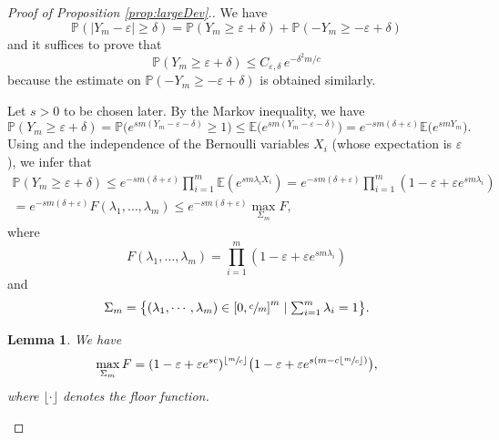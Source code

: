 \documentclass[10pt]{amsart}
\newtheorem{lemma}{Lemma}
\theoremstyle{definition}
\begin{document}
\begin{proof}[Proof of Proposition \ref{prop:largeDev}.]
We have
\[
\mathbb{P}( |Y_m - \varepsilon| \geq \delta) =\mathbb{P}\left(Y_m \geq \varepsilon + \delta\right)+\mathbb{P} \left( -Y_m \geq -\varepsilon + \delta\right)
\]
and it suffices to prove that
\[
\mathbb{P}( Y_m \geq \varepsilon + \delta) \leq C_{\varepsilon,\delta}\, e^{-\delta^2 m/c}
\]
because the estimate on $\mathbb{P} \left( -Y_m \geq -\varepsilon + \delta\right)$ is obtained similarly.

Let $s>0$ to be chosen later. By the Markov inequality, we have
\[
\mathbb{P}( Y_m \geq \varepsilon + \delta) = \mathbb{P} \bigl(e^{sm (Y_m - \varepsilon - \delta)} \geq 1\bigr)
\leq \mathbb{E}\bigl( e^{sm (Y_m - \varepsilon - \delta)}\bigr) = e^{-sm(\delta + \varepsilon)} \mathbb{E}\bigl( e^{sm Y_m} \bigr).
\]
Using and the independence of the Bernoulli variables $X_i$ (whose expectation is $\varepsilon$), we infer that
\begin{multline} \label{ineqwithF}
\mathbb{P}( Y_m \geq \varepsilon + \delta) \leq e^{-s m(\delta + \varepsilon)} \prod_{i=1}^{m} \mathbb{E}\left( e^{sm \lambda_i X_i } \right) = e^{-s m(\delta + \varepsilon)} \prod_{i=1}^{m} \left( 1-\varepsilon + \varepsilon e^{sm\lambda_i} \right) \\
= e^{-s m(\delta + \varepsilon)} F(\lambda_{1} , \dots, \lambda_{m} )
\leq e^{-s m(\delta + \varepsilon)} \max_{\Sigma_m}F,
\end{multline}
where
\[
F (\lambda_1,\dots,\lambda_m) = \prod_{i=1}^{m} \left( 1-\varepsilon + \varepsilon e^{sm \lambda_{i}} \right)
\]
and
\[\textstyle
\Sigma_m = \bigl\{ (\lambda_1,\cdots,\lambda_m) \in \left[0,\sfrac{c}{m}\right]^m \mid \sum_{i=1}^m \lambda_i = 1 \bigr\}.
\]

\begin{lemma}\label{lem:auxRes}
We have
\[
\max_{\Sigma_m}F=(1-\varepsilon+\varepsilon e^{sc})^{\left \lfloor{\sfrac{m}{c}}\right \rfloor}\bigl(1-\varepsilon+\varepsilon e^{s\left(m-c\left \lfloor{\sfrac{m}{c}}\right \rfloor\right)}\bigr),
\]
where $\lfloor \cdot \rfloor$ denotes the floor function.
\end{lemma}


\end{proof}
\end{document}
